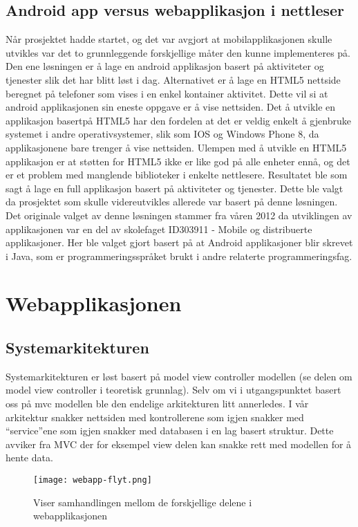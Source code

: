 \documentclass[../main.tex]{subfiles}
\begin{document}
\subsection{Android app versus webapplikasjon i nettleser}
Når prosjektet hadde startet, og det var avgjort at mobilapplikasjonen skulle utvikles var det to grunnleggende forskjellige måter den kunne implementeres på. Den ene løsningen er å lage en android applikasjon basert på aktiviteter og tjenester slik det har blitt løst i dag. Alternativet er å lage en HTML5 nettside beregnet på telefoner som vises i en enkel kontainer aktivitet. Dette vil si at android applikasjonen sin eneste oppgave er å vise nettsiden.\newline
Det å utvikle en applikasjon basertpå HTML5 har den fordelen at det er veldig enkelt å gjenbruke systemet i andre operativsystemer, slik som IOS og Windows Phone 8, da applikasjonene bare trenger å vise nettsiden. Ulempen med å utvikle en HTML5 applikasjon er at støtten for HTML5 ikke er like god på alle enheter ennå, og det er et problem med manglende biblioteker i enkelte nettlesere. \newline
Resultatet ble som sagt å lage en full applikasjon basert på aktiviteter og tjenester. Dette ble valgt da prosjektet som skulle videreutvikles allerede var basert på denne løsningen. Det originale valget av denne løsningen stammer fra våren 2012 da utviklingen av applikasjonen var en del av skolefaget ID303911 - Mobile og distribuerte applikasjoner. Her ble valget gjort basert på at Android applikasjoner blir skrevet i Java, som er programmeringsspråket brukt i andre relaterte programmeringsfag.

\section{Webapplikasjonen}

\subsection{Systemarkitekturen}
Systemarkitekturen er løst basert på model view controller modellen (se delen om model view controller i teoretisk grunnlag). Selv om vi i utgangspunktet basert oss på mvc modellen ble den endelige arkitekturen litt annerledes. I vår arkitektur snakker nettsiden med kontrollerene som igjen snakker med “service”ene som igjen snakker med databasen i en lag basert struktur. Dette avviker fra MVC der for eksempel view delen kan snakke rett med modellen for å hente data.
\begin{figure}[H]
  \centering
  \texttt{[image: webapp-flyt.png]}
  \caption{Viser samhandlingen mellom de forskjellige delene i webapplikasjonen}
\end{figure}
\end{document}
